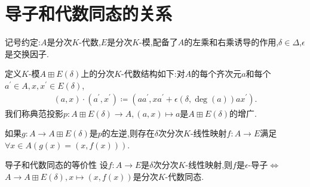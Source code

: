 \section{导子和代数同态的关系}

记号约定:$A$是分次$K$-代数,$E$是分次$K$-模,配备了$A$的左乘和右乘诱导的作用,$\delta\in\Delta$,$\epsilon$是交换因子.

\begin{definition}{}{}
	定义$K$-模$A\boxplus E\left(\delta\right)$上的分次$K$-代数结构如下:对$A$的每个齐次元$a$和每个$a^{\prime}\in A,x,x^{\prime}\in E\left(\delta\right)$,
	\begin{align*}
		\left(a,x\right)\cdot\left(a^{\prime},x^{\prime}\right)\coloneq\left(aa^{\prime},xa^{\prime}+\epsilon\left(\delta,\deg\left(a\right)\right)ax^{\prime}\right).
	\end{align*}
	我们称典范投影$p:A\boxplus E\left(\delta\right)\to A,\left(a,x\right)\mapsto a$是$A\boxplus E\left(\delta\right)$的增广.
\end{definition}

\begin{remark}{}{}
	如果$g:A\to A\boxplus E\left(\delta\right)$是$p$的左逆,则存在$\delta$次分次$K$-线性映射$f:A\to E$满足$\forall x\in A\left(g\left(x\right)=\left(x,f\left(x\right)\right)\right)$.
\end{remark}

\begin{proposition}{导子和代数同态的等价性}{}
	设$f:A\to E$是$\delta$次分次$K$-线性映射,则$f$是$\epsilon$-导子$\iff$ $A\to A\boxplus E\left(\delta\right),x\mapsto\left(x,f\left(x\right)\right)$是分次$K$-代数同态.
\end{proposition}

